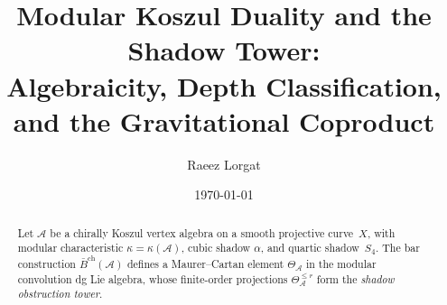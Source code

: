 \documentclass[11pt,reqno]{amsart}
\theoremstyle{definition}
\theoremstyle{remark}
\newcommand{\cA}{\mathcal{A}}
\newcommand{\barB}{\bar{B}}
\numberwithin{equation}{section}
\begin{document}
\title[Modular Koszul Duality and the Shadow Tower]
{Modular Koszul Duality and the Shadow Tower:\\
Algebraicity, Depth Classification,\\
and the Gravitational Coproduct}

\author{Raeez Lorgat}
\address{Department of Mathematics, Harvard University, Cambridge, MA 02138}

\date{\today}

\begin{abstract}
Let $\cA$ be a chirally Koszul vertex algebra on a smooth projective
curve~$X$, with modular characteristic $\kappa = \kappa(\cA)$, cubic
shadow $\alpha$, and quartic shadow~$S_4$. The bar construction
$\barB^{\mathrm{ch}}(\cA)$ defines a Maurer--Cartan element
$\Theta_\cA$ in the modular convolution dg Lie algebra, whose
finite-order projections $\Theta_\cA^{\le r}$ form the
\emph{shadow obstruction tower}.


\end{abstract}
\end{document}
